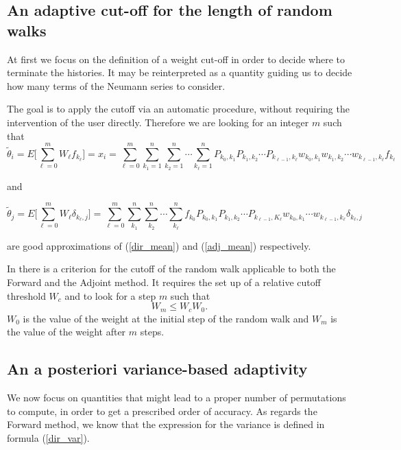 \documentclass[a4paper,10pt]{article}
\begin{document}
\subsection{An adaptive cut-off for the length of random walks}

At first we focus on the definition of a weight cut-off 
in order to decide where to terminate the histories. It may be reinterpreted as 
a quantity guiding us to decide how many terms of the Neumann 
series to consider. \newline

The goal is to apply the cutoff via an automatic procedure, without requiring 
the intervention of the user directly.
Therefore we are looking for an integer $m$ such that  
\[
\tilde{\theta}_i=E\bigg[\sum_{\ell=0}^m W_{\ell} 
f_{k_{\ell}}\bigg]=x_i=\sum_{\ell=0}^m 
\sum_{k_1=1}^{n}\sum_{k_2=1}^n\cdots \sum_{k_{\ell}=1}^n 
P_{k_0,k_1}P_{k_1,k_2}\cdots P_{k_{\ell-1}, 
k_{\ell}}w_{k_0,k_1}w_{k_1,k_2}\cdots 
w_{k_{\ell-1}, k_{\ell}}f_{k_{\ell}}
\]

and 

\[
\tilde{\theta}_j=E\bigg[\sum_{\ell=0}^m W_{\ell}\delta_{k_{\ell}, 
j}\bigg]=\sum_{\ell=0}^{m}\sum_{k_1}^n\sum_{k_2}^n\cdots\sum_{k_{\ell}}^n 
f_{k_0}P_{k_0,k_1}P_{k_1,k_2}\cdots P_{k_{\ell-1},K_{\ell}}w_{k_0,k_1}\cdots 
w_{k_{\ell-1},k_{\ell}}\delta_{k_{\ell},j}
\]

are good approximations of (\ref{dir_mean}) and (\ref{adj_mean}) respectively.


In \cite{Slattery2013} there is a criterion for the cutoff of the random walk 
applicable to both the Forward and the Adjoint method. It requires the set up 
of a relative cutoff threshold $W_c$ and to look for a step $m$ such that
\begin{equation}
W_m \le W_c W_0.
\label{cutoff}
\end{equation}
$W_0$ is the value of the weight at the initial step of the random walk and 
$W_m$ is the value of the weight after $m$ steps.

\subsection{An a posteriori variance-based adaptivity}

We now focus on quantities that might lead to a proper 
number of permutations to compute, in order to get a prescribed order of 
accuracy.
As regards the Forward method, we know that the expression for the variance 
is defined in formula (\ref{dir_var}).
\end{document}
